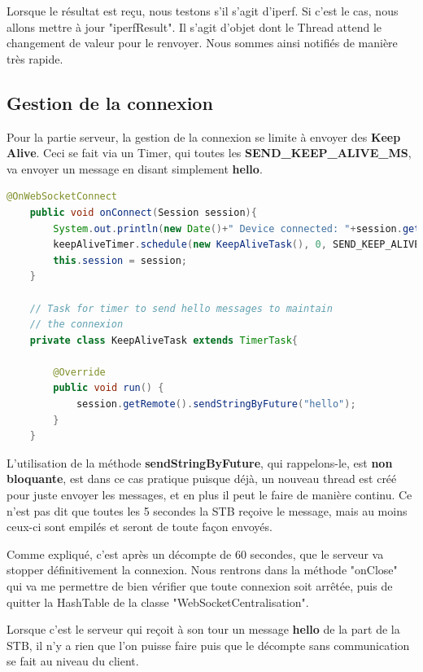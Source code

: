 Lorsque le résultat est reçu, nous testons s'il s'agit d'iperf. Si c'est le cas, nous allons mettre à jour "iperfResult". Il s'agit d'objet dont le Thread attend le changement de valeur pour le renvoyer. Nous sommes ainsi notifiés de manière très rapide.

\subsection{Gestion de la connexion}
Pour la partie serveur, la gestion de la connexion se limite à envoyer des \textbf{Keep Alive}. Ceci se fait via un Timer, qui toutes les \textbf{SEND\_KEEP\_ALIVE\_MS}, va envoyer un message en disant simplement \textbf{hello}.

\begin{lstlisting}[language=Java, caption={Code de lancement des Keep Alive}]
@OnWebSocketConnect
	public void onConnect(Session session){
		System.out.println(new Date()+" Device connected: "+session.getRemoteAddress().getHostString());
		keepAliveTimer.schedule(new KeepAliveTask(), 0, SEND_KEEP_ALIVE_MS);
		this.session = session;
	}
	
	// Task for timer to send hello messages to maintain 
	// the connexion
	private class KeepAliveTask extends TimerTask{
		
		@Override
		public void run() {
			session.getRemote().sendStringByFuture("hello");
		}
	}
\end{lstlisting}

L'utilisation de la méthode \textbf{sendStringByFuture}, qui rappelons-le, est \textbf{non bloquante}, est dans ce cas pratique puisque déjà, un nouveau thread est créé pour juste envoyer les messages, et en plus il peut le faire de manière continu. Ce n'est pas dit que toutes les 5 secondes la STB reçoive le message, mais au moins ceux-ci sont empilés et seront de toute façon envoyés.

\medskip

Comme expliqué, c'est après un décompte de 60 secondes, que le serveur va stopper définitivement la connexion. Nous rentrons dans la méthode "onClose" qui va me permettre de bien vérifier que toute connexion soit arrêtée, puis de quitter la HashTable de la classe "WebSocketCentralisation".

\medskip

Lorsque c'est le serveur qui reçoit à son tour un message \textbf{hello} de la part de la STB, il n'y a rien que l'on puisse faire puis que le décompte sans communication se fait au niveau du client.

